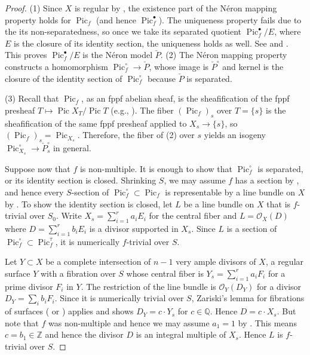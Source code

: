 \documentclass[reqno, letterpaper]{amsart}
\numberwithin{equation}{subsection}
\let\to\longrightarrow
\let\mapsto\longmapsto
\newcommand{\QQ}{\mathbb{Q}}
\newcommand{\ZZ}{\mathbb{Z}}
\DeclareMathOperator{\Pic}{Pic}
\begin{document}
		\begin{proof}
			(1) Since $X$ is regular by , the existence part of the N\'eron mapping property holds for $\Pic_f$ (and hence $\Pic^\bullet_f$). The uniqueness property fails due to the its non-separatedness, so once we take its separated quotient $\Pic^\bullet_f / E$, where $E$ is the closure of its identity section, the uniqueness holds as well. See \cite[Theorem~6.2]{hol19} and \cite[Lemma~6.12]{kim24}. This proves $\Pic^\bullet_f/E$ is the N\'eron model $\check P$. (2) The N\'eron mapping property constructs a homomorphism $\Pic^\circ_f \to \check P$, whose image is $\check P^\circ$ and kernel is the closure of the identity section of $\Pic^\circ_f$ because $\check P$ is separated.
			
			\medskip
			
			(3) Recall that $\Pic_f$, as an fppf abelian sheaf, is the sheafification of the fppf presheaf $T \mapsto \Pic X_T / \Pic T$ (e.g., \cite[\S 9.2]{kle:picard}). The fiber $(\Pic_f)_s$ over $T = \{ s \}$ is the sheafification of the same fppf presheaf applied to $X_s \to \{ s\}$, so $(\Pic_f)_s = \Pic_{X_s}$. Therefore, the fiber of (2) over $s$ yields an isogeny $\Pic^\circ_{X_s} \to \check P^\circ_s$ in general.
			
			\medskip
			
			Suppose now that $f$ is non-multiple. It is enough to show that $\Pic^\circ_f$ is separated, or its identity section is closed. Shrinking $S$, we may assume $f$ has a section by , and hence every $S$-section of $\Pic^\circ_f \subset \Pic_f$ is representable by a line bundle on $X$ by \cite[Theorem~9.2.5]{kle:picard}. To show the identity section is closed, let $L$ be a line bundle on $X$ that is $f$-trivial over $S_0$. Write $X_s = \sum_{i=1}^r a_iE_i$ for the central fiber and $L = \mathcal O_X(D)$ where $D = \sum_{i=1}^r b_i E_i$ is a divisor supported in $X_s$. Since $L$ is a section of $\Pic^\circ_f \subset \Pic^\tau_f$, it is numerically $f$-trivial over $S$.
			
			Let $Y \subset X$ be a complete intersection of $n-1$ very ample divisors of $X$, a regular surface $Y$ with a fibration over $S$ whose central fiber is $Y_s = \sum_{i=1}^r a_i F_i$ for a prime divisor $F_i$ in $Y$. The restriction of the line bundle is $\mathcal O_Y(D_Y)$ for a divisor $D_Y = \sum_i b_i F_i$. Since it is numerically trivial over $S$, Zariski's lemma for fibrations of surfaces (\cite[Lemma~III.8.2]{bar-hulek-pet-van:surface} or \cite[Theorem~9.1.23]{liu:ag}) applies and shows $D_Y = c \cdot Y_s$ for $c \in \QQ$. Hence $D = c \cdot X_s$. But note that $f$ was non-multiple and hence we may assume $a_1 = 1$ by . This means $c = b_1 \in \ZZ$ and hence the divisor $D$ is an integral multiple of $X_s$. Hence $L$ is $f$-trivial over $S$.
		\end{proof}
		
\end{document}
